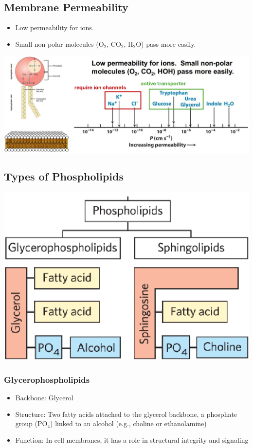 \documentclass[10pt]{article}
\begin{document}
\subsection*{Membrane Permeability}
\begin{itemize}
    \item Low permeability for ions.  
    \item Small non-polar molecules (O$_2$, CO$_2$, H$_2$O) pass more easily.
\end{itemize}
\begin{center}
    \includegraphics*[width=\textwidth]{L3_6.png}
\end{center}

\subsection*{Types of Phospholipids}
\begin{center}
    \includegraphics*[scale=0.7]{L3_7.png}
\end{center}
\subsubsection*{Glycerophospholipids}
\begin{itemize}
    \item Backbone: Glycerol
    \item Structure:  Two fatty acids attached to the glycerol backbone, a phosphate group (PO$_4$) linked to an alcohol (e.g., choline or ethanolamine)
    \item Function: In cell membranes, it has a role in structural integrity and signaling
\end{itemize}
\end{document}
